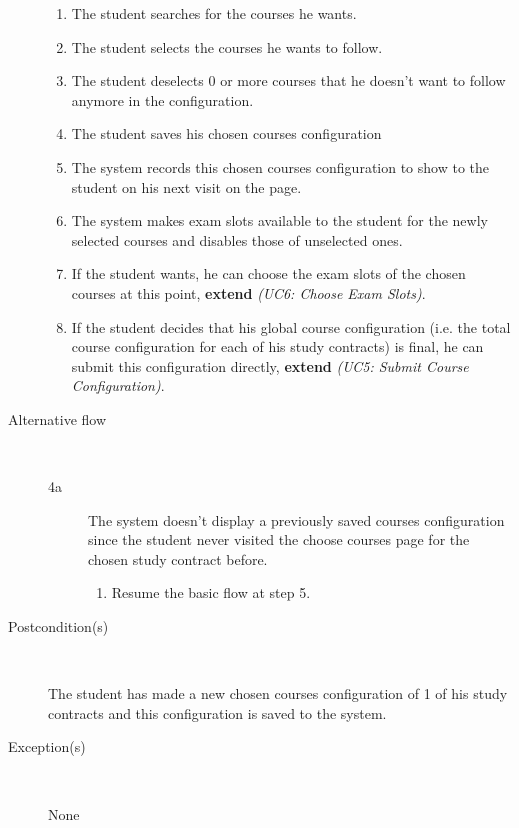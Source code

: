 \begin{description}
\begin{enumerate}
	  	\item The student searches for the courses he wants.
	  	\item The student selects the courses he wants to follow.
	  	\item The student deselects 0 or more courses that he doesn't want to
	  	follow anymore in the configuration.
	  	\item The student saves his chosen courses configuration
	  	\item The system records this chosen courses configuration to show to the
	  	student on his next visit on the page.
	  	\item The system makes exam slots available to the student for the newly
	  	selected courses and disables those of unselected ones.
	  	\item If the student wants, he can choose the exam slots of the chosen
	  	courses at this point, \textbf{extend} \emph{(UC6: Choose Exam Slots)}.
	  	\item If the student decides that his global course configuration (i.e. the
	  	total course configuration for each of his study contracts) is final, he
	  	can submit this configuration directly, \textbf{extend} \emph{(UC5: Submit
	  	Course Configuration)}.
	\end{enumerate}
	\item[Alternative flow] \
		\begin{description}
		\item[4a] The system doesn't display a previously saved courses
		configuration since the student never visited the choose courses page for the
		chosen study contract before.
			\begin{enumerate}
			  \item Resume the basic flow at step 5.
			\end{enumerate}
		\end{description}
	\item[Postcondition(s)] \ 
		\par The student has made a new chosen courses configuration of 1 of his study
		contracts and this configuration is saved to the system.
	\item[Exception(s)] \ 
		\par None
\end{description}